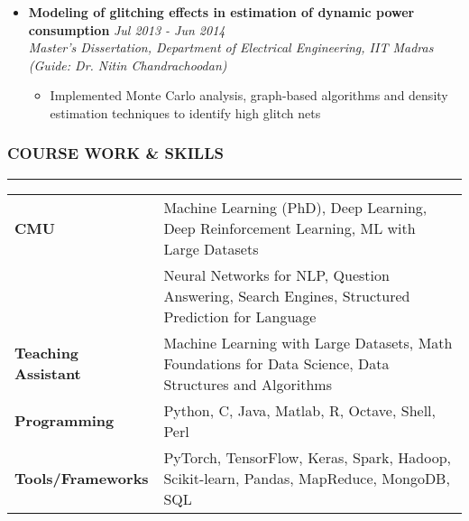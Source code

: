 \documentclass[10pt,a4paper,English]{article}
\newcommand\roottitle[1]{\vspace{-4mm}\subsubsection*{\uppercase{#1}}\vspace{-0.3em}\nopagebreak[4]\hrule\vspace{4mm}}
\newcommand\itemyear[1]{\hfill \emph{\color{itemyear} #1}}
\newcommand\itemenv{\setlength\itemsep{0.5pt} \addtolength{\itemindent}{-5mm}\vspace{-1.5mm}}
\begin{document}
\begin{itemize}
    \item \textbf{Modeling of glitching effects in estimation of dynamic power consumption} \itemyear{Jul 2013 - Jun 2014} \\
    \emph{Master's Dissertation, Department of Electrical Engineering, IIT Madras (Guide: Dr. Nitin Chandrachoodan)}
        \begin{itemize} \itemenv
            \item Implemented Monte Carlo analysis, graph-based algorithms and density estimation techniques to identify high glitch nets
        \end{itemize}
\end{itemize}

\roottitle{Course Work \& Skills}
\vspace{-2mm}
\renewcommand{\arraystretch}{1.2}
\setlength\tabcolsep{0pt}
\begin{tabularx}{\textwidth}{ l @{ - } X }
\textbf{CMU}                        & Machine Learning (PhD), Deep Learning, Deep Reinforcement Learning, ML with Large Datasets  \\
                                    & Neural Networks for NLP, Question Answering, Search Engines, Structured Prediction for Language \\
\textbf{Teaching Assistant}         & Machine Learning with Large Datasets, Math Foundations for Data Science, Data Structures and Algorithms \\
\textbf{Programming}                & Python, C, Java, Matlab, R, Octave, Shell, Perl \\
\textbf{Tools/Frameworks}           & PyTorch, TensorFlow, Keras, Spark, Hadoop, Scikit-learn, Pandas, MapReduce, MongoDB, SQL \\
\end{tabularx}
\vspace{2mm}
\end{document}
